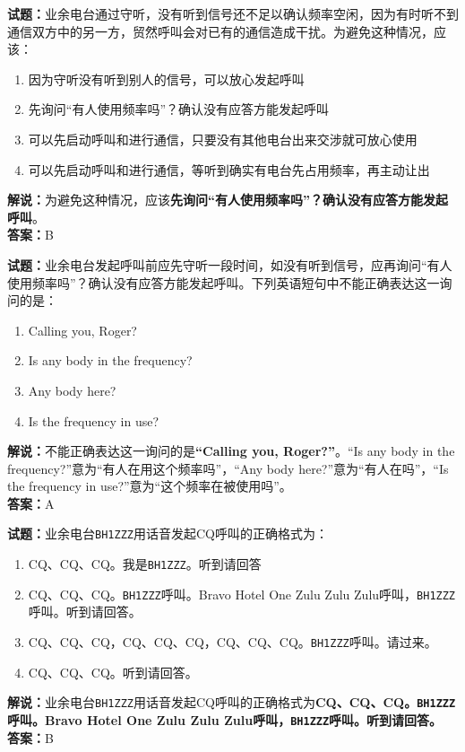 \documentclass{ctexbook}
\begin{document}
\bigskip

\noindent\textbf{试题：}业余电台通过守听，没有听到信号还不足以确认频率空闲，因为有时听不到通信双方中的另一方，贸然呼叫会对已有的通信造成干扰。为避免这种情况，应该：
\begin{enumerate}[leftmargin=3em]
  \item 因为守听没有听到别人的信号，可以放心发起呼叫
  \item 先询问“有人使用频率吗”？确认没有应答方能发起呼叫
  \item 可以先启动呼叫和进行通信，只要没有其他电台出来交涉就可放心使用
  \item 可以先启动呼叫和进行通信，等听到确实有电台先占用频率，再主动让出
\end{enumerate}
\noindent\textbf{解说：}为避免这种情况，应该\textbf{先询问“有人使用频率吗”？确认没有应答方能发起呼叫}。\\\noindent\textbf{答案：}B

\bigskip

\noindent\textbf{试题：}业余电台发起呼叫前应先守听一段时间，如没有听到信号，应再询问“有人使用频率吗”？确认没有应答方能发起呼叫。下列英语短句中不能正确表达这一询问的是：
\begin{enumerate}[leftmargin=3em]
  \item Calling you, Roger?
  \item Is any body in the frequency?
  \item Any body here?
  \item Is the frequency in use?
\end{enumerate}
\noindent\textbf{解说：}不能正确表达这一询问的是\textbf{“Calling you, Roger?”}。“Is any body in the frequency?”意为“有人在用这个频率吗”，“Any body here?”意为“有人在吗”，“Is the frequency in use?”意为“这个频率在被使用吗”。\\
\noindent\textbf{答案：}A

\bigskip

\noindent\textbf{试题：}业余电台\texttt{BH1ZZZ}用话音发起CQ呼叫的正确格式为：
\begin{enumerate}[leftmargin=3em]
  \item CQ、CQ、CQ。我是\texttt{BH1ZZZ}。听到请回答
  \item CQ、CQ、CQ。\texttt{BH1ZZZ}呼叫。Bravo Hotel One Zulu Zulu Zulu呼叫，\texttt{BH1ZZZ}呼叫。听到请回答。
  \item CQ、CQ、CQ，CQ、CQ、CQ，CQ、CQ、CQ。\texttt{BH1ZZZ}呼叫。请过来。
  \item CQ、CQ、CQ。听到请回答。
\end{enumerate}
\noindent\textbf{解说：}业余电台\texttt{BH1ZZZ}用话音发起CQ呼叫的正确格式为\textbf{CQ、CQ、CQ。\texttt{BH1ZZZ}呼叫。Bravo Hotel One Zulu Zulu Zulu呼叫，\texttt{BH1ZZZ}呼叫。听到请回答。}\cite{icao}\cite[49]{yeyuwuxiandiantongxin}\\
\noindent\textbf{答案：}B
\end{document}
